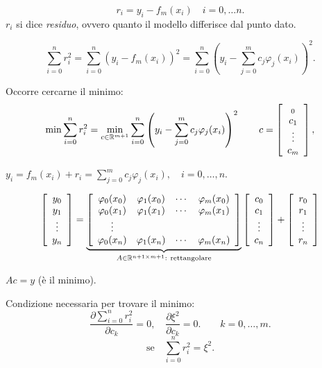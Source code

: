 \[
r_i = y_i - f_m(x_i) \quad i = 0, \ldots n.
\]
$r_i$ si dice \emph{residuo}, ovvero quanto il modello differisce dal punto
dato.

\[
\sum_{i=0}^nr_i^2 = \sum_{i=0}^n\left(y_i - f_m(x_i)\right)^2
= \sum_{i=0}^n\left(y_i - \sum_{j=0}^mc_j\varphi_j(x_i)\right)^2.
\]

Occorre cercarne il minimo:
\[
\min\sum_{i=0}^nr_i^2 = \min_{c \in \rr^{m+1}} \sum_{i=0}^n\left(y_i -
\sum_{j=0}^mc_j\varphi_j(x_i)\right)^2 \qquad c = \left[\begin{array}c_0\\
c_1 \\ \vdots \\ c_m \end{array}\right],
\]

$y_i = f_m(x_i) + r_i = \sum_{j=0}^mc_j\varphi_j(x_i), \quad i = 0,\ldots, n$.

\[
\left[ \begin{array}{c}y_0\\y_1\\\vdots\\y_n\end{array}\right] =
\underbrace{\left[ \begin{array}{cccc}
\varphi_0(x_0) & \varphi_1(x_0) & \cdots & \varphi_m(x_0) \\
\varphi_0(x_1) & \varphi_1(x_1) & \cdots & \varphi_m(x_1) \\
\vdots \\
\varphi_0(x_n) & \varphi_1(x_n) & \cdots & \varphi_m(x_n)
\end{array}\right]}_{A \in \rr^{n+1 \times m+1}: \ \textrm{rettangolare}}
\left[ \begin{array}{c}c_0\\c_1\\\vdots\\c_n\end{array}\right]+
\left[ \begin{array}{c}r_0\\r_1\\\vdots\\r_n\end{array}\right]
\]

$Ac = y$ (è il minimo).

\begin{flushleft}
Condizione necessaria per trovare il minimo:
\[
\frac{\partial\sum_{i=0}^nr_i^2}{\partial c_k}= 0, \quad
\frac{\partial\xi^2}{\partial c_k} = 0. \qquad k = 0, \ldots,m.
\]
\[
\textrm{se} \quad \sum_{i=0}^nr_i^2 = \xi^2.
\]
\end{flushleft}

